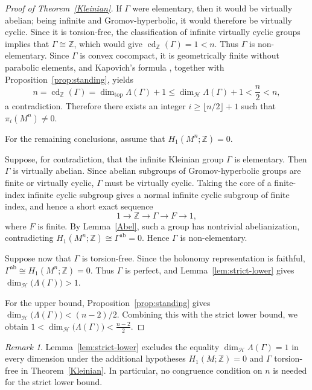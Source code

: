 \documentclass[12pt,oneside,a4paper]{article}
\theoremstyle{mytheorem}
\theoremstyle{remark}
\newtheorem{remark}[definition]{Remark}
\theoremstyle{definition}
\begin{document}
\begin{proof}[Proof of Theorem~\ref{Kleinian}]
If $\Gamma$ were elementary, then it would be virtually abelian; being infinite
and Gromov-hyperbolic, it would therefore be virtually cyclic. Since it is
torsion-free, the classification of infinite virtually cyclic groups implies
that $\Gamma\cong\mathbb Z$, which would give
$\operatorname{cd}_{\mathbb Z}(\Gamma)=1<n$. Thus $\Gamma$ is
non-elementary. Since $\Gamma$ is convex cocompact, it is geometrically finite
without parabolic elements, and Kapovich's formula
\cite[Proposition~9.6]{MR2491697}, together with
Proposition~\ref{prop:standing}, yields
\[
n=\operatorname{cd}_{\mathbb Z}(\Gamma)
 =\dim_{\mathrm{top}}\Lambda(\Gamma)+1
 \leq\dim_{\mathcal H}\Lambda(\Gamma)+1
 <\frac n2<n,
\]
a contradiction. Therefore there exists an integer
$i\geq\lfloor n/2\rfloor+1$ such that $\pi_i(M^n)\neq0$.


For the remaining conclusions, assume that
$H_1(M^n;\mathbb Z)=0$.


Suppose, for contradiction, that the infinite Kleinian group $\Gamma$ is
elementary. Then $\Gamma$ is virtually abelian. Since abelian subgroups of
Gromov-hyperbolic groups are finite or virtually cyclic, $\Gamma$ must be
virtually cyclic. Taking the core of a finite-index infinite cyclic subgroup
gives a normal infinite cyclic subgroup of finite index, and hence a short
exact sequence
\[
1 \longrightarrow \mathbb{Z} \longrightarrow \Gamma \longrightarrow F \longrightarrow 1,
\]
where $F$ is finite. By Lemma~\ref{Abel}, such a group has nontrivial
abelianization, contradicting
$H_1(M^n;\mathbb Z)\cong\Gamma^{\mathrm{ab}}=0$. Hence $\Gamma$ is
non-elementary.





Suppose now that $\Gamma$ is torsion-free. Since the holonomy representation
is faithful, $\Gamma^{\mathrm{ab}}\cong H_1(M^n;\mathbb Z)=0.$ Thus
$\Gamma$ is perfect, and Lemma~\ref{lem:strict-lower} gives
$\dim_{\mathcal H}\!\bigl(\Lambda(\Gamma)\bigr)>1.$

For the upper bound, Proposition~\ref{prop:standing} gives
$\dim_{\mathcal H}\!\bigl(\Lambda(\Gamma)\bigr)<(n-2)/2$. Combining this
with the strict lower bound, we obtain
$1<\dim_{\mathcal H}\!\bigl(\Lambda(\Gamma)\bigr)<\frac{n-2}{2}$.
\end{proof}

\begin{remark}
Lemma~\ref{lem:strict-lower} excludes the equality
$\dim_{\mathcal H}\Lambda(\Gamma)=1$ in every dimension under the additional
hypotheses $H_1(M;\mathbb Z)=0$ and $\Gamma$ torsion-free in
Theorem~\ref{Kleinian}. In particular, no congruence condition on $n$ is
needed for the strict lower bound.
\end{remark}
\end{document}
